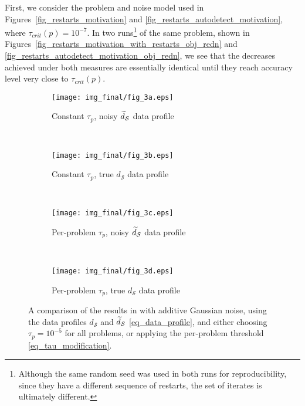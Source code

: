 First, we consider the problem and noise model used in Figures~\ref{fig_restarts_motivation} and \ref{fig_restarts_autodetect_motivation}, where $\tau_{crit}(p)=10^{-7}$.
In two runs\footnote{\:Although the same random seed was used in both runs for reproducibility, since they have a different sequence of restarts, the set of iterates is ultimately different.} of the same problem, shown in Figures~\ref{fig_restarts_motivation_with_restarts_obj_redn} and \ref{fig_restarts_autodetect_motivation_obj_redn}, we see that the decreases achieved under both measures are essentially identical until they reach accuracy level very close to $\tau_{crit}(p)$.

\begin{figure}
	\centering
	\begin{subfigure}[b]{0.48\textwidth}
		\texttt{[image: img\_final/fig\_3a.eps]}
		\caption{Constant $\tau_p$, noisy $\widetilde{d}_{\mathcal{S}}$ data profile}
		\label{fig_threshold_demonstration_tau_fixed_noisyf}
	\end{subfigure}
	~
	\begin{subfigure}[b]{0.48\textwidth}
		\texttt{[image: img\_final/fig\_3b.eps]}
		\caption{Constant $\tau_p$, true $d_{\mathcal{S}}$ data profile}
		\label{fig_threshold_demonstration_tao_fixed_truef}
	\end{subfigure}
	\\
	\begin{subfigure}[b]{0.48\textwidth}
		\texttt{[image: img\_final/fig\_3c.eps]}
		\caption{Per-problem $\tau_p$, noisy $\widetilde{d}_{\mathcal{S}}$ data profile}
		\label{fig_threshold_demonstration_tao_prob_adj_noisyf}
	\end{subfigure}
	~
	\begin{subfigure}[b]{0.48\textwidth}
		\texttt{[image: img\_final/fig\_3d.eps]}
		\caption{Per-problem $\tau_p$, true $d_{\mathcal{S}}$ data profile}
		\label{fig_threshold_demonstration_tau_prob_adj_truef}
	\end{subfigure}
	\caption{A comparison of the results in  with additive Gaussian noise, using the data profiles $d_{\mathcal{S}}$ and $\widetilde{d}_{\mathcal{S}}$ \eqref{eq_data_profile}, and either choosing $\tau_p=10^{-5}$ for all problems, or applying the per-problem threshold \eqref{eq_tau_modification}.}
	\label{fig_threshold_demonstration}
\end{figure}

